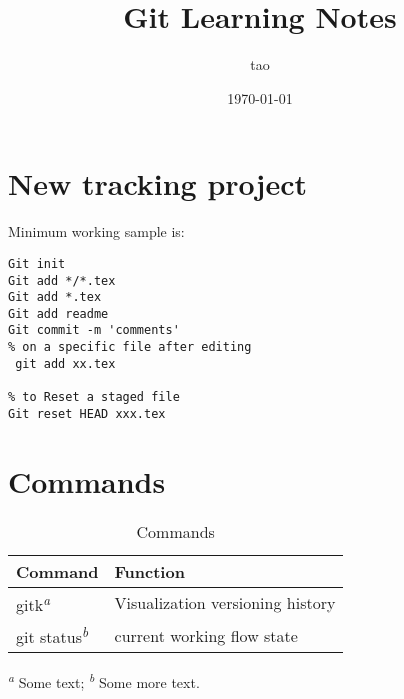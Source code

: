\documentclass[12pt,letterpaper]{article}
\title{Git Learning Notes}
\author{tao}
\date{\today}
\begin{document}
\maketitle
\section{New tracking project}
Minimum working sample is:
\begin{lstlisting}
Git init
Git add */*.tex
Git add *.tex
Git add readme
Git commit -m 'comments'
% on a specific file after editing
 git add xx.tex

% to Reset a staged file
Git reset HEAD xxx.tex

\end{lstlisting}


\section{Commands}

\begin{table}
  \caption{Commands}
  \label{tbl:notes}
  \begin{tabular}{ll}
    \toprule
    Command                            & Function \\
    \midrule
    gitk\textsuperscript{\emph{a}}   & Visualization versioning history  \\
    git status\textsuperscript{\emph{b}} & current working flow state \\
    
    \bottomrule
  \end{tabular}

  \textsuperscript{\emph{a}} Some text;
  \textsuperscript{\emph{b}} Some more text.
\end{table}
\end{document}
